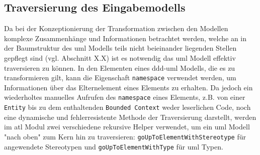 \documentclass[
	oneside,  %
	ngerman, 
	final, 
	11pt, 
	a4paper, 
	1.1headlines, 
	headinclude=false, 
	footinclude=false, 
	mpinclude=false, 
	pagesize, 
	onecolumn, 
	titlepage, 
	parskip=half, 
	headsepline, 
	chapterprefix=false, 
	version=first, 
	listof=totoc, 
	bibliography=totoc, 
	toc=graduated, 
	fleqn
]{scrbook}
\begin{document}
\subsection{Traversierung des Eingabemodells}
Da bei der Konzeptionierung der Transformation zwischen den Modellen komplexe Zusammenhänge und Informationen betrachtet werden, welche an in der Baumstruktur des \ac{uml} Modells teils nicht beieinander liegenden Stellen gepflegt sind (vgl. Abschnitt X.X) ist es notwendig das \ac{uml} Modell effektiv traversieren zu können. In den Elementen eines \ac{ddd}-{uml} Modells, die es zu transformieren gilt, kann die Eigenschaft \texttt{namespace} verwendet werden, um Informationen über das Elternelement eines Elements zu erhalten. Da jedoch ein wiederholtes manuelles Aufrufen des \texttt{namespace} eines Elements, z.B. von einer \texttt{Entity} bis zu dem enthaltenden \texttt{Bounded Context} weder leserlichen Code, noch eine dynamische und fehlerresistente Methode der Traversierung darstellt, werden im \ac{atl} Modul zwei verschiedene rekursive Helper verwendet, um ein \ac{uml} Modell "nach oben" zum Kern hin zu traversieren:
 \texttt{goUpToElementWithStereotype} für angewendete Stereotypen und \texttt{goUpToElementWithType} für \ac{uml} Typen. 
 
\end{document}
